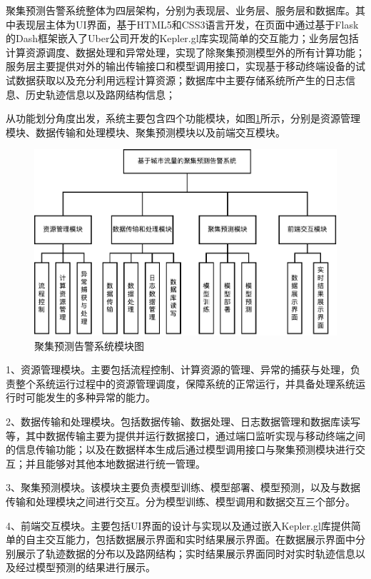 \documentclass[master]{thesis-uestc}
\begin{document}
聚集预测告警系统整体为四层架构，分别为表现层、业务层、服务层和数据库。其中表现层主体为UI界面，基于HTML5和CSS3语言开发，在页面中通过基于Flask的Dash框架嵌入了Uber公司开发的Kepler.gl库实现简单的交互能力；业务层包括计算资源调度、数据处理和异常处理，实现了除聚集预测模型外的所有计算功能；服务层主要提供对外的输出传输接口和模型调用接口，实现基于移动终端设备的试试数据获取以及充分利用远程计算资源；数据库中主要存储系统所产生的日志信息、历史轨迹信息以及路网结构信息；

从功能划分角度出发，系统主要包含四个功能模块，如图\ref{Figure.5.4}所示，分别是资源管理模块、数据传输和处理模块、聚集预测模块以及前端交互模块。
\begin{figure}[!ht]
\centering
\includegraphics[width=1.0\linewidth]{./pic/模块图.pdf}
\caption{聚集预测告警系统模块图}
\label{Figure.5.4}
\end{figure}

1、资源管理模块。主要包括流程控制、计算资源的管理、异常的捕获与处理，负责整个系统运行过程中的资源管理调度，保障系统的正常运行，并具备处理系统运行时可能发生的多种异常的能力。

2、数据传输和处理模块。包括数据传输、数据处理、日志数据管理和数据库读写等，其中数据传输主要为提供并运行数据接口，通过端口监听实现与移动终端之间的信息传输功能；以及在数据样本生成后通过模型调用接口与聚集预测模块进行交互；并且能够对其他本地数据进行统一管理。

3、聚集预测模块。该模块主要负责模型训练、模型部署、模型预测，以及与数据传输和处理模块之间进行交互。分为模型训练、模型调用和数据交互三个部分。

4、前端交互模块。主要包括UI界面的设计与实现以及通过嵌入Kepler.gl库提供简单的自主交互能力，包括数据展示界面和实时结果展示界面。在数据展示界面中分别展示了轨迹数据的分布以及路网结构；实时结果展示界面同时对实时轨迹信息以及经过模型预测的结果进行展示。
\end{document}
